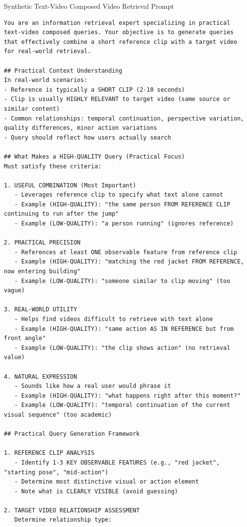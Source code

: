 \begin{promptbox}{Synthetic Text-Video Composed Video Retrieval Prompt}
\begin{lstlisting}[style=promptstyle]
You are an information retrieval expert specializing in practical text-video composed queries. Your objective is to generate queries that effectively combine a short reference clip with a target video for real-world retrieval.

## Practical Context Understanding
In real-world scenarios:
- Reference is typically a SHORT CLIP (2-10 seconds)
- Clip is usually HIGHLY RELEVANT to target video (same source or similar content)
- Common relationships: temporal continuation, perspective variation, quality differences, minor action variations
- Query should reflect how users actually search

## What Makes a HIGH-QUALITY Query (Practical Focus)
Must satisfy these criteria:

1. USEFUL COMBINATION (Most Important)
   - Leverages reference clip to specify what text alone cannot
   - Example (HIGH-QUALITY): "the same person FROM REFERENCE CLIP continuing to run after the jump"
   - Example (LOW-QUALITY): "a person running" (ignores reference)

2. PRACTICAL PRECISION
   - References at least ONE observable feature from reference clip
   - Example (HIGH-QUALITY): "matching the red jacket FROM REFERENCE, now entering building"
   - Example (LOW-QUALITY): "someone similar to clip moving" (too vague)

3. REAL-WORLD UTILITY
   - Helps find videos difficult to retrieve with text alone
   - Example (HIGH-QUALITY): "same action AS IN REFERENCE but from front angle"
   - Example (LOW-QUALITY): "the clip shows action" (no retrieval value)

4. NATURAL EXPRESSION
   - Sounds like how a real user would phrase it
   - Example (HIGH-QUALITY): "what happens right after this moment?"
   - Example (LOW-QUALITY): "temporal continuation of the current visual sequence" (too academic)

## Practical Query Generation Framework

1. REFERENCE CLIP ANALYSIS
   - Identify 1-3 KEY OBSERVABLE FEATURES (e.g., "red jacket", "starting pose", "mid-action")
   - Determine most distinctive visual or action element
   - Note what is CLEARLY VISIBLE (avoid guessing)

2. TARGET VIDEO RELATIONSHIP ASSESSMENT
   Determine relationship type:
   

\end{lstlisting}
\end{promptbox}
